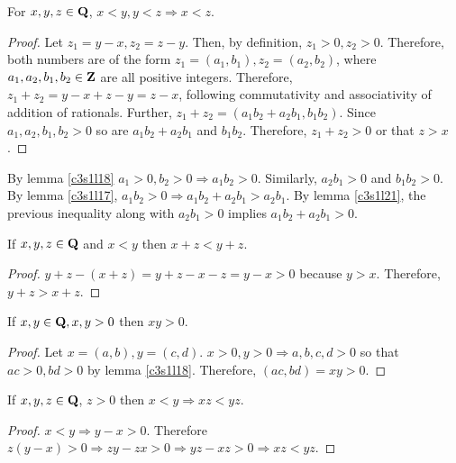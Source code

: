 \begin{lem}\label{c3s2l21}
For $x, y, z \in \mathbf{Q}$, $x < y, y < z \Rightarrow x < z$.
\end{lem}
\begin{proof}
Let $z_1 = y - x, z_2 = z - y$. Then, by definition, $z_1 > 0, z_2 > 0$.
Therefore, both numbers are of the form $z_1 = (a_1, b_1), z_2 = (a_2, 
b_2)$, where $a_1, a_2, b_1, b_2 \in \mathbf{Z}$ are all positive integers. 
Therefore, $z_1 + z_2 = y - x + z - y = z - x$, following commutativity
and associativity of addition of rationals. Further, $z_1 + z_2 = (a_1b_2
+ a_2b_1, b_1b_2)$. Since $a_1, a_2, b_1, b_2 > 0$ so are $a_1b_2 + 
a_2b_1$ and $b_1b_2$. Therefore, $z_1 + z_2 > 0$ or that $z > x$.
\end{proof}

\begin{rem}
By lemma \ref{c3s1l18} $a_1 > 0, b_2 > 0 \Rightarrow a_1b_2 > 0$. 
Similarly, $a_2b_1 > 0$ and $b_1b_2 > 0$. By lemma \ref{c3s1l17}, $a_1b_2 
> 0 \Rightarrow a_1b_2 + a_2b_1 > a_2b_1$. By lemma \ref{c3s1l21}, the 
previous inequality along with $a_2b_1 > 0$ implies $a_1b_2 + a_2b_1 > 0$.
\end{rem}

\begin{lem}\label{c3s2l22}
If $x, y, z \in \mathbf{Q}$ and $x < y$ then $x + z < y + z$.
\end{lem}
\begin{proof}
$y + z - (x + z) = y + z - x - z = y - x > 0$ because $y > x$. Therefore,
$y +z > x + z$.
\end{proof}

\begin{lem}\label{c3s2l23}
If $x, y \in \mathbf{Q}, x, y > 0$ then $xy > 0$.
\end{lem}
\begin{proof}
Let $x = (a, b), y = (c, d)$. $x > 0, y > 0 \Rightarrow a, b, c, d > 0$
so that $ac > 0, bd > 0$ by lemma \ref{c3s1l18}. Therefore, $(ac, bd) =
xy > 0$.
\end{proof}

\begin{lem}\label{c3s2l24}
If $x, y, z \in \mathbf{Q}$, $z > 0$ then $x < y \Rightarrow xz < yz$.
\end{lem}
\begin{proof}
$x < y \Rightarrow y - x > 0$. Therefore $z(y - x) > 0 \Rightarrow zy - zx
> 0 \Rightarrow yz - xz > 0 \Rightarrow xz < yz$.
\end{proof}

